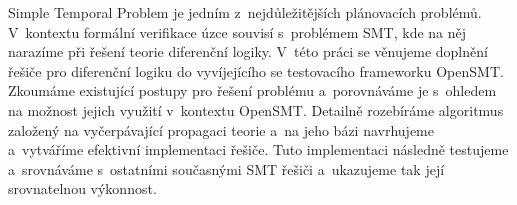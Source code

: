\documentclass[12pt]{report}
\begin{document}
Simple Temporal Problem je jedním z~nejdůležitějších plánovacích problémů. V~kontextu formální verifikace úzce souvisí s~problémem SMT, kde na něj narazíme při řešení teorie diferenční logiky. V~této práci se věnujeme doplnění řešiče pro diferenční logiku do vyvíjejícího se testovacího frameworku OpenSMT. Zkoumáme existující postupy pro řešení problému a~porovnáváme je s~ohledem na možnost jejich využití v~kontextu OpenSMT. Detailně rozebíráme algoritmus založený na vyčerpávající propagaci teorie a~na jeho bázi navrhujeme a~vytváříme efektivní implementaci řešiče. Tuto implementaci následně testujeme a~srovnáváme s~ostatními současnými SMT řešiči a~ukazujeme tak její srovnatelnou výkonnost.
\end{document}

